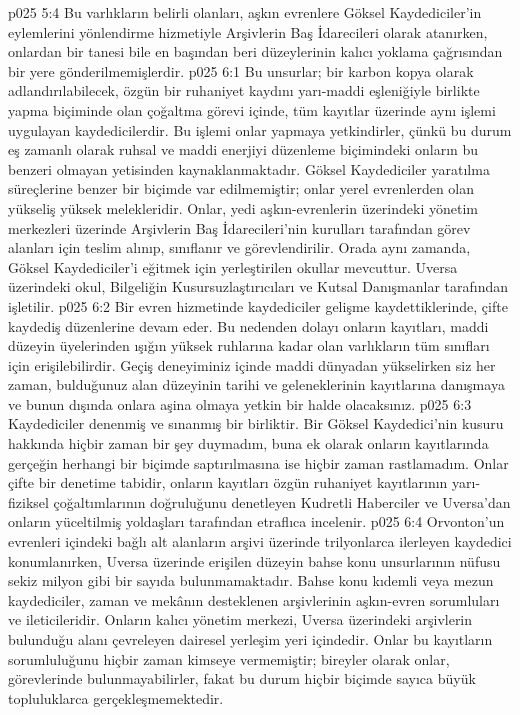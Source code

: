\vs p025 5:4 Bu varlıkların belirli olanları, aşkın evrenlere Göksel Kaydediciler’in eylemlerini yönlendirme hizmetiyle Arşivlerin Baş İdarecileri olarak atanırken, onlardan bir tanesi bile en başından beri düzeylerinin kalıcı yoklama çağrısından bir yere gönderilmemişlerdir.
\vs p025 6:1 Bu unsurlar; bir karbon kopya olarak adlandırılabilecek, özgün bir ruhaniyet kaydını yarı\hyp{}maddi eşleniğiyle birlikte yapma biçiminde olan çoğaltma görevi içinde, tüm kayıtlar üzerinde aynı işlemi uygulayan kaydedicilerdir. Bu işlemi onlar yapmaya yetkindirler, çünkü bu durum eş zamanlı olarak ruhsal ve maddi enerjiyi düzenleme biçimindeki onların bu benzeri olmayan yetisinden kaynaklanmaktadır. Göksel Kaydediciler yaratılma süreçlerine benzer bir biçimde var edilmemiştir; onlar yerel evrenlerden olan yükseliş yüksek melekleridir. Onlar, yedi aşkın\hyp{}evrenlerin üzerindeki yönetim merkezleri üzerinde Arşivlerin Baş İdarecileri’nin kurulları tarafından görev alanları için teslim alınıp, sınıflanır ve görevlendirilir. Orada aynı zamanda, Göksel Kaydediciler’i eğitmek için yerleştirilen okullar mevcuttur. Uversa üzerindeki okul, Bilgeliğin Kusursuzlaştırıcıları ve Kutsal Danışmanlar tarafından işletilir.
\vs p025 6:2 Bir evren hizmetinde kaydediciler gelişme kaydettiklerinde, çifte kaydediş düzenlerine devam eder. Bu nedenden dolayı onların kayıtları, maddi düzeyin üyelerinden ışığın yüksek ruhlarına kadar olan varlıkların tüm sınıfları için erişilebilirdir. Geçiş deneyiminiz içinde maddi dünyadan yükselirken siz her zaman, bulduğunuz alan düzeyinin tarihi ve geleneklerinin kayıtlarına danışmaya ve bunun dışında onlara aşina olmaya yetkin bir halde olacaksınız.
\vs p025 6:3 Kaydediciler denenmiş ve sınanmış bir birliktir. Bir Göksel Kaydedici’nin kusuru hakkında hiçbir zaman bir şey duymadım, buna ek olarak onların kayıtlarında gerçeğin herhangi bir biçimde saptırılmasına ise hiçbir zaman rastlamadım. Onlar çifte bir denetime tabidir, onların kayıtları özgün ruhaniyet kayıtlarının yarı\hyp{}fiziksel çoğaltımlarının doğruluğunu denetleyen Kudretli Haberciler ve Uversa’dan onların yüceltilmiş yoldaşları tarafından etraflıca incelenir.
\vs p025 6:4 Orvonton’un evrenleri içindeki bağlı alt alanların arşivi üzerinde trilyonlarca ilerleyen kaydedici konumlanırken, Uversa üzerinde erişilen düzeyin bahse konu unsurlarının nüfusu sekiz milyon gibi bir sayıda bulunmamaktadır. Bahse konu kıdemli veya mezun kaydediciler, zaman ve mekânın desteklenen arşivlerinin aşkın\hyp{}evren sorumluları ve ileticileridir. Onların kalıcı yönetim merkezi, Uversa üzerindeki arşivlerin bulunduğu alanı çevreleyen dairesel yerleşim yeri içindedir. Onlar bu kayıtların sorumluluğunu hiçbir zaman kimseye vermemiştir; bireyler olarak onlar, görevlerinde bulunmayabilirler, fakat bu durum hiçbir biçimde sayıca büyük topluluklarca gerçekleşmemektedir.
